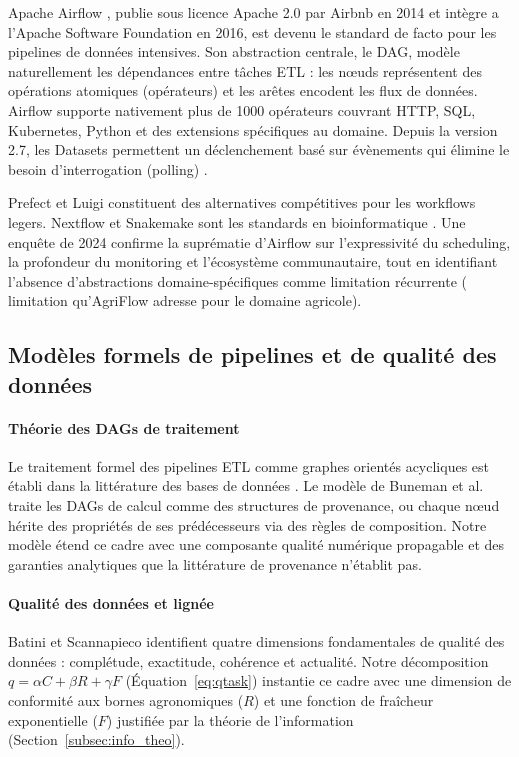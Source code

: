 \documentclass[12pt]{article}
\begin{document}
Apache Airflow \cite{airflow_docs}, publie sous licence Apache 2.0 par
Airbnb en 2014 et intègre a l'Apache Software Foundation en 2016, est
devenu le standard de facto pour les pipelines de données intensives.
Son abstraction centrale, le DAG, modèle naturellement les dépendances
entre tâches ETL : les n\oe uds représentent des opérations atomiques
(opérateurs) et les arêtes encodent les flux de données.
Airflow supporte nativement plus de 1000 opérateurs couvrant HTTP,
SQL, Kubernetes, Python et des extensions spécifiques au domaine.
Depuis la version 2.7, les Datasets permettent un déclenchement basé
sur évènements qui élimine le besoin d'interrogation (polling)
\cite{airflow_docs}.

Prefect et Luigi constituent des alternatives compétitives pour les
workflows legers. Nextflow et Snakemake sont les standards en
bioinformatique \cite{bioinformatics_workflow}. Une enquête de 2024
\cite{pipeline_survey_2024} confirme la suprématie d'Airflow sur
l’expressivité du scheduling, la profondeur du monitoring et l'écosystème
communautaire, tout en identifiant l'absence d'abstractions
domaine-spécifiques comme limitation récurrente ( limitation qu'AgriFlow
adresse pour le domaine agricole).

\subsection{Modèles formels de pipelines et de qualité des données}

\paragraph{Théorie des DAGs de traitement}

Le traitement formel des pipelines ETL comme graphes orientés acycliques
est établi dans la littérature des bases de données \cite{dag_pipeline_formal}.
Le modèle de Buneman et al. \cite{data_provenance} traite les DAGs
de calcul comme des structures de provenance, ou chaque n\oe ud hérite
des propriétés de ses prédécesseurs via des règles de composition.
Notre modèle étend ce cadre avec une composante qualité numérique
propagable et des garanties analytiques que la littérature de provenance
n’établit pas.

\paragraph{Qualité des données et lignée}

Batini et Scannapieco \cite{data_lineage_quality} identifient quatre
dimensions fondamentales de qualité des données : complétude, exactitude,
cohérence et actualité. Notre décomposition $q = \alpha C + \beta R +
\gamma F$ (Équation~\eqref{eq:qtask}) instantie ce cadre avec une
dimension de conformité aux bornes agronomiques ($R$) et une fonction
de fraîcheur exponentielle ($F$) justifiée par la théorie de l'information
(Section~\ref{subsec:info_theo}).
\end{document}
